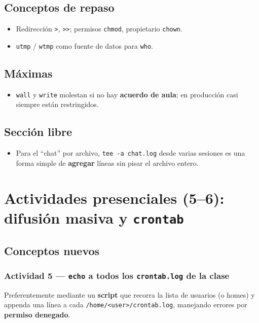 \documentclass[11pt, letterpaper]{article}
\begin{document}
\subsection{Conceptos de repaso}
\label{sec:orgab9176f}

\begin{itemize}
\item Redirección \texttt{>}, \texttt{>{}>{}}; permisos \texttt{chmod}, propietario \texttt{chown}.
\item \texttt{utmp} / \texttt{wtmp} como fuente de datos para \texttt{who}.
\end{itemize}
\subsection{Máximas}
\label{sec:org7367539}

\begin{itemize}
\item \texttt{wall} y \texttt{write} molestan si no hay \textbf{acuerdo de aula}; en producción casi siempre están restringidos.
\end{itemize}
\subsection{Sección libre}
\label{sec:orga59f678}

\begin{itemize}
\item Para el “chat” por archivo, \texttt{tee -a chat.log} desde varias sesiones es una forma simple de \textbf{agregar} líneas sin pisar el archivo entero.
\end{itemize}
\section{Actividades presenciales (5–6): difusión masiva y \texttt{crontab}}
\label{sec:orgd877263}

\subsection{Conceptos nuevos}
\label{sec:orgdca2fcb}

\subsubsection{Actividad 5 — \texttt{echo} a \textbf{todos} los \texttt{crontab.log} de la clase}
\label{sec:orgd309b27}
Preferentemente mediante un \textbf{script} que recorra la lista de usuarios (o homes) y appenda una línea a cada \texttt{/home/<user>/crontab.log}, manejando errores por \textbf{permiso denegado}.
\end{document}
